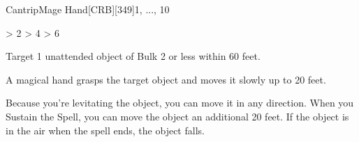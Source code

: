 
\begin{card-collection}{Cantrip}{\level}{Mage Hand}[CRB][349]{\level}{1, ..., 10}




{%
\def\bulk{L}
\def\range{30 feet}
\ifnum \level > 2 
\def\bulk{1}
\fi
\ifnum \level > 4
\def\range{60 feet}
\fi
\ifnum \level > 6 
\def\bulk{2}
\fi

Target 1 unattended object of Bulk \bulk{} or less within \range.
}

A magical hand grasps the target object and moves it slowly up to 20 feet. 

Because you're levitating the object, you can move it in any direction. 
When you Sustain the Spell, you can move the object an additional 20 feet. 
If the object is in the air when the spell ends, the object falls.
\end{card-collection}